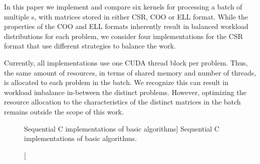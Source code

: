 In this paper we implement and compare six kernels for processing
a batch of multiple {\spmv}s, with matrices stored in either CSR, COO or ELL format.
While the properties of the COO and ELL formats inherently result in
balanced workload distributions for each problem, we consider four implementations
for the CSR format that use different strategies to balance the work.

Currently, all implementations use one CUDA thread block per problem.
Thus, the same amount of resources, in terms of
shared memory and number of threads, is allocated to each problem in the batch.
We recognize this can result in workload imbalance in-between the distinct problems.
However, optimizing the resource allocation to the characteristics of the distinct matrices in the batch remains outside the scope of this work.

\begin{figure}[t]
\begin{minipage}{\textwidth}

\end{minipage}
\begin{minipage}{\textwidth}

\end{minipage}
\begin{minipage}{\textwidth}

\end{minipage}
\begin{minipage}{\textwidth}

\end{minipage}
\caption
[Sequential C implementations of basic \spmv algorithms]
{Sequential C implementations of basic \spmv algorithms.}
\label{2017-batched-spmv:fig:spmv}
\end{figure}

